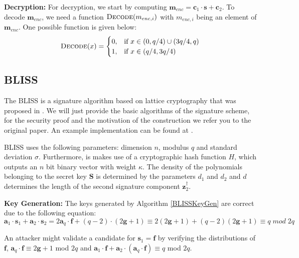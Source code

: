 \textbf{Decryption:} For decryption, we start by computing \(\textbf{m}_{enc} = \textbf{c}_1 \cdot \textbf{s} + \textbf{c}_2\). To decode \(\textbf{m}_{enc}\), we need a function \(\textsc{Decode}(m_{enc,i})\) with \(m_{enc,i}\) being an element of \(\textbf{m}_{enc}\). One possible function is given below:
\begin{equation}
    \textsc{Decode}(x)=\begin{cases}
        0, & \text{if }x \in (0,q/4) \cup (3q/4,q)\\
        1, & \text{if }x \in (q/4,3q/4)
    \end{cases}
\end{equation}

\subsection{BLISS}
The \acf{BLISS} is a signature algorithm based on lattice cryptography that was proposed in \cite{bliss}. We will just provide the basic algorithms of the signature scheme, for the security proof and the motivation of the construction we refer you to the original paper.
An example implementation can be found at \cite{Poeppelmann2014}.

\ac{BLISS} uses the following parameters: dimension \(n\), modulus \(q\) and standard deviation \(\sigma\). Furthermore, is makes use of a cryptographic hash function \(H\), which outputs an \(n\) bit binary vector with weight \(\kappa\). The density of the polynomials belonging to the secret key \(\textbf{S}\) is determined by the parameters \(d_1\) and \(d_2\) and \(d\) determines the length of the second signature component \(\textbf{z}_2^\dagger\).

\textbf{Key Generation:} The keys generated by Algorithm \ref{BLISSKeyGen} are correct due to the following equation:
\begin{equation}
    \textbf{a}_1 \cdot \textbf{s}_1 + \textbf{a}_2 \cdot \textbf{s}_2 = 2 \textbf{a}_q \cdot \textbf{f} + (q - 2) \cdot (2 \textbf{g} + 1) \equiv 2 (2 \textbf{g} + 1) + (q - 2) (2 \textbf{g} + 1) \equiv q \; mod \; 2q
\end{equation}

An attacker might validate a candidate for \(\textbf{s}_1 = \textbf{f}\) by verifying the distributions of \(\textbf{f}\), \(\textbf{a}_q \cdot \textbf{f} \equiv 2 \textbf{g} + 1\) mod \(2q\) and \(\textbf{a}_1 \cdot \textbf{f} + \textbf{a}_2 \cdot (\textbf{a}_q \cdot \textbf{f}) \equiv q\) mod \(2q\).

